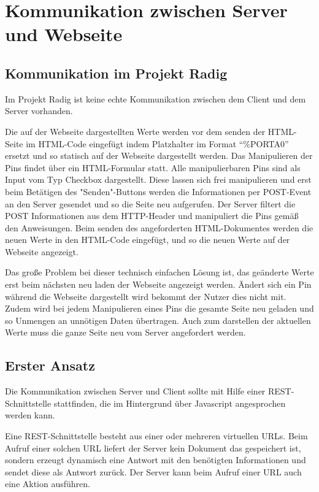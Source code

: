 \chapter{Kommunikation zwischen Server und Webseite}

\section{Kommunikation im Projekt Radig}
Im Projekt Radig ist keine echte Kommunikation zwischen dem Client und dem Server 
vorhanden. 

Die auf der Webseite dargestellten Werte werden vor dem senden der HTML-Seite 
im HTML-Code eingefügt indem Platzhalter im Format "`\%PORTA0"' ersetzt und so statisch auf 
der Webseite dargestellt werden. Das Manipulieren der Pins findet über ein HTML-Formular 
statt. Alle manipulierbaren Pins sind als Input vom Typ Checkbox dargestellt. Diese lassen 
sich frei manipulieren und erst beim Betätigen des "Senden"-Buttons werden die 
Informationen per POST-Event an den Server gesendet und so die Seite neu aufgerufen. Der 
Server filtert die POST Informationen aus dem HTTP-Header und manipuliert die Pins gemäß 
den Anweisungen. Beim senden des angeforderten HTML-Dokumentes werden die neuen Werte in 
den HTML-Code eingefügt, und so die neuen Werte auf der Webseite angezeigt.

Das große Problem bei dieser technisch einfachen Lösung ist, das geänderte Werte erst beim 
nächsten neu laden der Webseite angezeigt werden. Ändert sich ein Pin während die Webseite 
dargestellt wird bekommt der Nutzer dies nicht mit. Zudem wird bei jedem Manipulieren 
eines Pins die gesamte Seite neu geladen und so Unmengen an unnötigen Daten übertragen. 
Auch zum darstellen der aktuellen Werte muss die ganze Seite neu vom Server angefordert 
werden.

\section{Erster Ansatz}
Die Kommunikation zwischen Server und Client sollte mit Hilfe einer REST-Schnittstelle 
stattfinden, die im Hintergrund über Javascript angesprochen werden kann. 

Eine REST-Schnittstelle besteht aus einer oder mehreren virtuellen URLs. Beim Aufruf einer 
solchen URL liefert der Server kein Dokument das gespeichert ist, sondern erzeugt 
dynamisch eine Antwort mit den benötigten Informationen und sendet diese als Antwort 
zurück. Der Server kann beim Aufruf einer URL auch eine Aktion ausführen.

